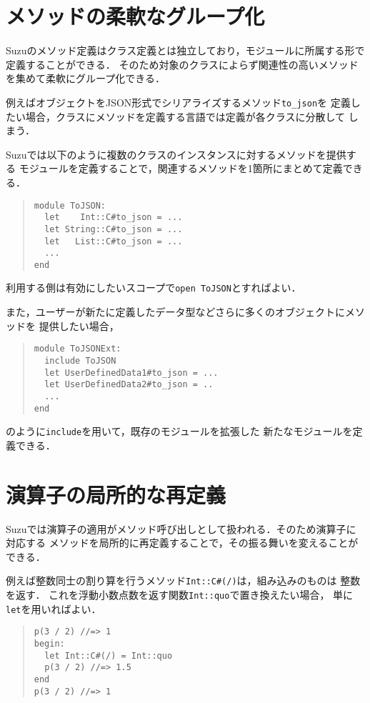 \documentclass[a4paper,11pt,dvipdfmx]{jreport}
\begin{document}
\section{メソッドの柔軟なグループ化}

Suzuのメソッド定義はクラス定義とは独立しており，モジュールに所属する形で
定義することができる．
そのため対象のクラスによらず関連性の高いメソッドを集めて柔軟にグループ化できる．

例えばオブジェクトをJSON形式でシリアライズするメソッド\verb|to_json|を
定義したい場合，クラスにメソッドを定義する言語では定義が各クラスに分散して
しまう．

Suzuでは以下のように複数のクラスのインスタンスに対するメソッドを提供する
モジュールを定義することで，関連するメソッドを1箇所にまとめて定義できる．
\begin{quote}
\begin{verbatim}
module ToJSON:
  let    Int::C#to_json = ...
  let String::C#to_json = ...
  let   List::C#to_json = ...
  ...
end
\end{verbatim}
\end{quote}
利用する側は有効にしたいスコープで\verb|open ToJSON|とすればよい．

また，ユーザーが新たに定義したデータ型などさらに多くのオブジェクトにメソッドを
提供したい場合，
\begin{quote}
\begin{verbatim}
module ToJSONExt:
  include ToJSON
  let UserDefinedData1#to_json = ...
  let UserDefinedData2#to_json = ..
  ...
end
\end{verbatim}
\end{quote}
のように\verb|include|を用いて，既存のモジュールを拡張した
新たなモジュールを定義できる．


\section{演算子の局所的な再定義}

Suzuでは演算子の適用がメソッド呼び出しとして扱われる．そのため演算子に対応する
メソッドを局所的に再定義することで，その振る舞いを変えることができる．

例えば整数同士の割り算を行うメソッド\verb|Int::C#(/)|は，組み込みのものは
整数を返す．
これを浮動小数点数を返す関数\verb|Int::quo|で置き換えたい場合，
単に\verb|let|を用いればよい．
\begin{quote}
\begin{verbatim}
p(3 / 2) //=> 1
begin:
  let Int::C#(/) = Int::quo
  p(3 / 2) //=> 1.5
end
p(3 / 2) //=> 1
\end{verbatim}
\end{quote}
\end{document}

